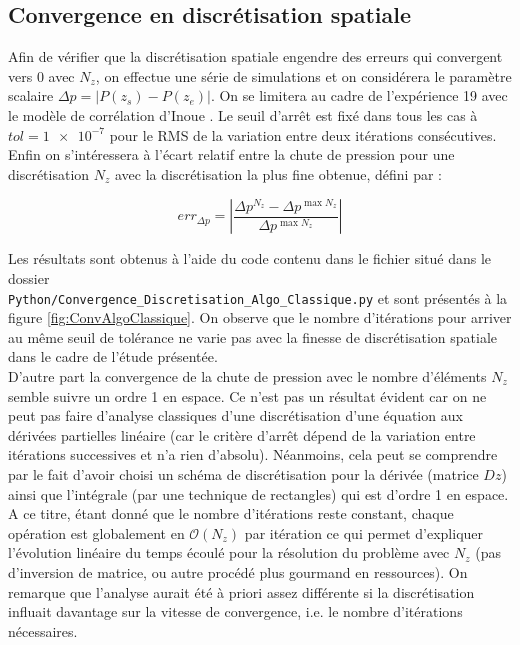 \subsection{Convergence en discrétisation spatiale}

Afin de vérifier que la discrétisation spatiale engendre des erreurs qui convergent vers 0 avec $N_z$, on effectue une série de simulations et on considérera le paramètre scalaire $\Delta p = \left| P(z_s)-P(z_e) \right|$.  On se limitera au cadre de l'expérience 19 avec le modèle de corrélation d'Inoue \cite{inoueInbundleVoidMeasurement1993}. Le seuil d'arrêt est fixé dans tous les cas à $tol = \num{1e-7}$ pour le RMS de la variation entre deux itérations consécutives. Enfin on s'intéressera à l'écart relatif entre la chute de pression pour une discrétisation $N_z$ avec la discrétisation la plus fine obtenue, défini par :

\begin{equation}
    err_{\Delta p} = \left|\frac{ \Delta p^{N_z} - \Delta p ^{\max{N_z}} }{\Delta p ^{\max{N_z}}}\right|
\end{equation}

Les résultats sont obtenus à l'aide du code contenu dans le fichier situé dans le dossier\\ \texttt{Python/Convergence\_Discretisation\_Algo\_Classique.py} et sont présentés à la figure \ref{fig:ConvAlgoClassique}. On observe que le nombre d'itérations pour arriver au même seuil de tolérance ne varie pas avec la finesse de discrétisation spatiale dans le cadre de l'étude présentée.\\

D'autre part la convergence de la chute de pression avec le nombre d'éléments $N_z$ semble suivre un ordre 1 en espace. Ce n'est pas un résultat évident car on ne peut pas faire d'analyse classiques d'une discrétisation d'une équation aux dérivées partielles linéaire (car le critère d'arrêt dépend de la variation entre itérations successives et n'a rien d'absolu). Néanmoins, cela peut se comprendre par le fait d'avoir choisi un schéma de discrétisation pour la dérivée (matrice $Dz$) ainsi que l'intégrale (par une technique de rectangles) qui est d'ordre 1 en espace. \\

A ce titre, étant donné que le nombre d'itérations reste constant, chaque opération est globalement en $\mathcal{O}(N_z)$ par itération ce qui permet d'expliquer l'évolution linéaire du temps écoulé pour la résolution du problème avec $N_z$ (pas d'inversion de matrice, ou autre procédé plus gourmand en ressources). On remarque que l'analyse aurait été à priori assez différente si la discrétisation influait davantage sur la vitesse de convergence, i.e. le nombre d'itérations nécessaires.\\


